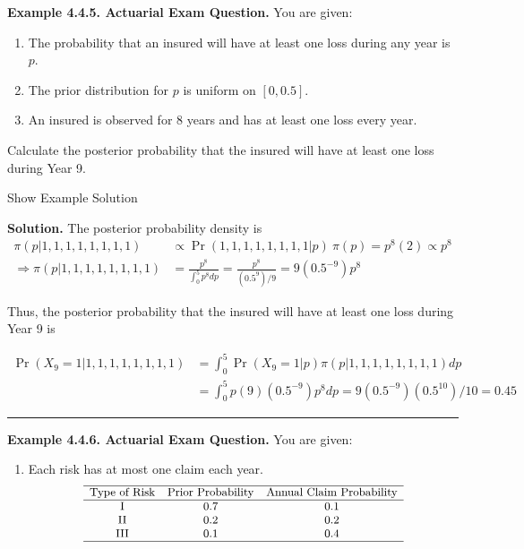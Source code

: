 \documentclass[]{book}
\providecommand{\tightlist}{%
  \setlength{\itemsep}{0pt}\setlength{\parskip}{0pt}}
\theoremstyle{definition}
\theoremstyle{definition}
\theoremstyle{definition}
\theoremstyle{remark}
\begin{document}
\textbf{Example 4.4.5. Actuarial Exam Question.} You are given:

\begin{enumerate}
\def\labelenumi{(\roman{enumi})}
\tightlist
\item
  The probability that an insured will have at least one loss during any
  year is \(p\).
\item
  The prior distribution for \(p\) is uniform on \([0, 0.5]\).
\item
  An insured is observed for 8 years and has at least one loss every
  year.
\end{enumerate}

Calculate the posterior probability that the insured will have at least
one loss during Year 9.

Show Example Solution

\hypertarget{toggleExampleSelect.4.5}{}
\textbf{Solution.} The posterior probability density is
\[\begin{aligned}
\pi(p|1,1,1,1,1,1,1,1) &\propto \Pr(1,1,1,1,1,1,1,1|p)\ \pi(p) = p^8(2) \propto p^8 \\ 
\Rightarrow \pi(p|1,1,1,1,1,1,1,1) &= \frac{p^8}{\int_0^5 p^8 dp} = \frac{p^8}{(0.5^9)/9} = 9(0.5^{-9})p^8
\end{aligned}\]

Thus, the posterior probability that the insured will have at least one
loss during Year 9 is

\[\begin{aligned}
\Pr(X_9=1|1,1,1,1,1,1,1,1) &= \int_0^5 \Pr(X_9=1|p) \pi(p|1,1,1,1,1,1,1,1) dp \\
&= \int_0^5 p(9)(0.5^{-9})p^8 dp = 9(0.5^{-9})(0.5^{10})/10 = 0.45
\end{aligned}\]

\begin{center}\rule{0.5\linewidth}{\linethickness}\end{center}

\textbf{Example 4.4.6. Actuarial Exam Question.} You are given:

\begin{enumerate}
\def\labelenumi{(\roman{enumi})}
\tightlist
\item
  Each risk has at most one claim each year. \[
  {\small
  \begin{array}{ccc}
  \hline
  \text{Type of Risk} & \text{Prior Probability} & \text{Annual Claim Probability} \\
  \hline
  \text{I} & 0.7 & 0.1 \\
  \text{II} & 0.2 & 0.2 \\
  \text{III} & 0.1 & 0.4 \\ 
  \hline
  \end{array}
  }
  \]
\end{enumerate}
\end{document}
